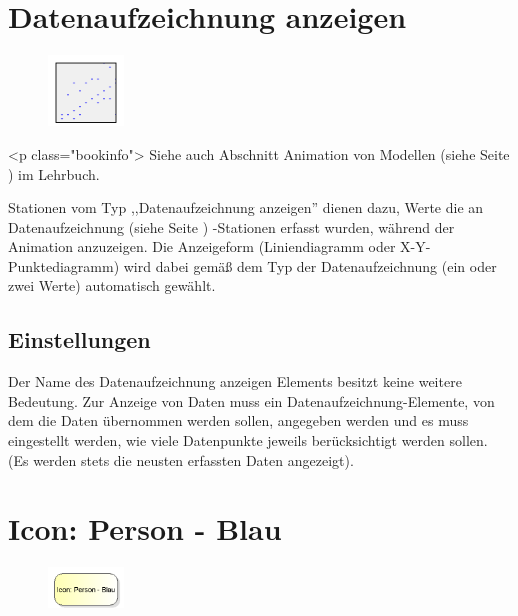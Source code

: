 \section{Datenaufzeichnung anzeigen}
\label{ref:ModelElementAnimationRecord}

\begin{figure}
\vspace{-22pt}
\includegraphics[width=2cm]{imageModelElementAnimationRecord.png}
\vspace{-22pt}
\end{figure}

<p class="bookinfo">
Siehe auch Abschnitt Animation von Modellen (siehe Seite \pageref{ref:book:5.4.3}) im Lehrbuch.

Stationen vom Typ ,,Datenaufzeichnung anzeigen'' dienen dazu, Werte die an
Datenaufzeichnung (siehe Seite \pageref{ref:ModelElementRecord}) -Stationen erfasst
wurden, während der Animation anzuzeigen. Die Anzeigeform (Liniendiagramm oder
X-Y-Punktediagramm) wird dabei gemäß dem Typ der Datenaufzeichnung (ein oder zwei Werte)
automatisch gewählt.

\subsection*{Einstellungen}

Der Name des Datenaufzeichnung anzeigen Elements besitzt keine weitere Bedeutung.
Zur Anzeige von Daten muss ein Datenaufzeichnung-Elemente, von dem die Daten
übernommen werden sollen, angegeben werden und es muss eingestellt werden, wie
viele Datenpunkte jeweils berücksichtigt werden sollen. (Es werden stets die neusten
erfassten Daten angezeigt).


\section{Icon: Person - Blau}
\label{ref:ModelElementClientIcon}

\begin{figure}
\vspace{-22pt}
\includegraphics[width=2cm]{imageModelElementClientIcon.png}
\vspace{-22pt}
\end{figure}

